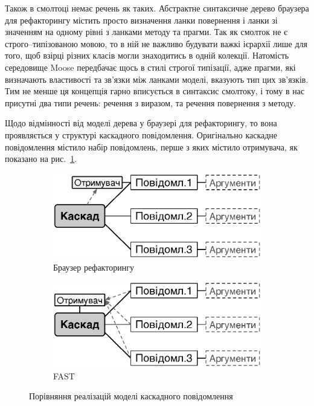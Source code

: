 \documentclass[12pt,a4paper]{article}
\begin{document}
Також в смолтоці немає речень як таких. Абстрактне синтаксичне дерево браузера для рефакторингу містить просто визначення ланки повернення і ланки зі значенням на одному рівні з ланками методу та прагми. Так як смолток не є строго--типізованою мовою, то в ній не важливо будувати важкі ієрархії лише для того, щоб взірці різних класів могли знаходитись в одній колекції. Натомість середовище Moose передбачає щось в стилі строгої типізації, адже прагми, які визначають властивості та зв'язки між ланками моделі, вказують тип цих зв'язків. Тим не менше ця концепція гарно вписується в синтаксис смолтоку, і тому в нас присутні два типи речень: речення з виразом, та речення повернення з методу.

Щодо відмінності від моделі дерева у браузері для рефакторингу, то вона проявляється у структурі каскадного повідомлення. Оригінально каскадне повідомлення містило набір повідомлень, перше з яких містило отримувача, як показано на рис.~\ref{rbCascade}.
\begin{figure}[h]
        \vspace{\columnsep}
        \centering
        \begin{subfigure}[b]{0.45\textwidth}
                \centering
                \includegraphics[width=\textwidth]{rbCascade}
                \caption{Браузер рефакторингу\label{rbCascade}}
        \end{subfigure}
        \hspace{0.05\textwidth}
        \begin{subfigure}[b]{0.45\textwidth}
                \centering
                \includegraphics[width=\textwidth]{fastCascade}
                \caption{FAST\label{fastCascade}}
        \end{subfigure}
        \caption{Порівняння реалізацій моделі каскадного повідомлення}
\end{figure}
\end{document}
